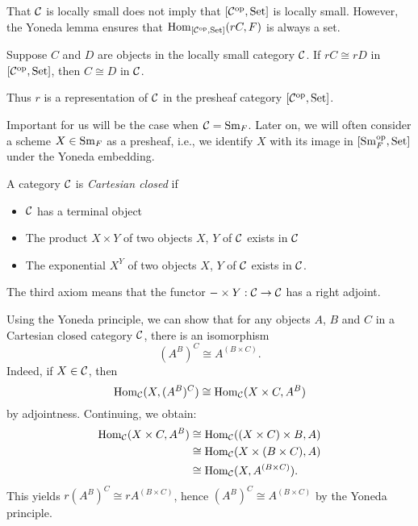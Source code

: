 \begin{remark}
That $\mathcal{C}$ is locally small does not imply that $[\mathcal{C}^{\mathrm{op}},\mathrm{Set}]$ is locally small. However, the Yoneda lemma ensures that $\operatorname{Hom}_{[\mathcal{C}^{\mathrm{op}},\mathrm{Set}]}(rC,F)$ is always a set.
\end{remark}

\begin{corollary}
Suppose $C$ and $D$ are objects in the locally small category $\mathcal{C}$. If $rC\cong rD$ in $[\mathcal{C}^{\mathrm{op}},\mathrm{Set}]$, then $C\cong D$ in $\mathcal{C}$.
\end{corollary}

Thus $r$ is a representation of $\mathcal{C}$ in the presheaf category $[\mathcal{C}^{\mathrm{op}},\mathrm{Set}]$.

\begin{example}
Important for us will be the case when $\mathcal{C}=\mathrm{Sm}_F$. Later on, we will often consider a scheme $X\in\mathrm{Sm}_F$ as a presheaf, i.e., we identify $X$ with its image in $[\mathrm{Sm}_F^{\mathrm{op}},\mathrm{Set}]$ under the Yoneda embedding.
\end{example}

\begin{example}
A category $\mathcal{C}$ is \emph{Cartesian closed} if 
\begin{itemize}
\item $\mathcal{C}$ has a terminal object
\item The product $X\times Y$ of two objects $X$, $Y$ of $\mathcal{C}$ exists in $\mathcal{C}$
\item The exponential $X^Y$ of two objects $X$, $Y$ of $\mathcal{C}$ exists in $\mathcal{C}$.
\end{itemize}
The third axiom means that the functor $-\times Y:\mathcal{C}\to\mathcal{C}$ has a right adjoint.

Using the Yoneda principle, we can show that for any objects $A$, $B$ and $C$ in a Cartesian closed category $\mathcal{C}$, there is an isomorphism
\[
(A^B)^C\cong A^{(B\times C)}.
\]Indeed, if $X\in\mathcal{C}$, then
\[
\operatorname{Hom}_{\mathcal{C}}(X,(A^B)^C)\cong\operatorname{Hom}_{\mathcal{C}}(X\times C,A^B)
\]by adjointness. Continuing, we obtain:
\begin{align*}
\operatorname{Hom}_{\mathcal{C}}(X\times C,A^B) &\cong\operatorname{Hom}_{\mathcal{C}}((X\times C)\times B,A)\\
&\cong\operatorname{Hom}_{\mathcal{C}}(X\times(B\times C),A)\\
&\cong\operatorname{Hom}_{\mathcal{C}}(X,A^{(B\times C)}).
\end{align*}
This yields $r(A^B)^C\cong rA^{(B\times C)}$, hence $(A^B)^C\cong A^{(B\times C)}$ by the Yoneda principle.
\end{example}

